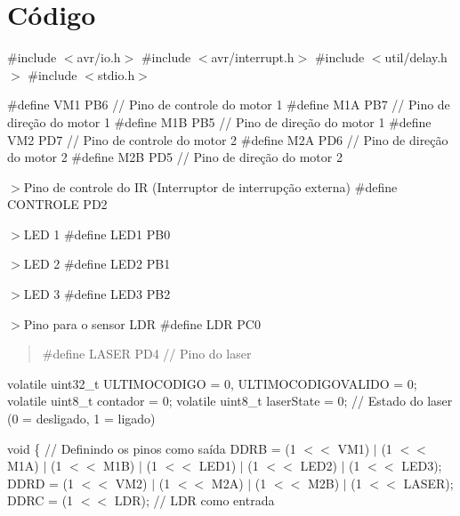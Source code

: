 \chapter{Código}
\hypertarget{md__src_2_c_x_c3_x_b3digo}{}\label{md__src_2_c_x_c3_x_b3digo}
\#include \texorpdfstring{$<$}{<}avr/io.\+h\texorpdfstring{$>$}{>} \#include \texorpdfstring{$<$}{<}avr/interrupt.\+h\texorpdfstring{$>$}{>} \#include \texorpdfstring{$<$}{<}util/delay.\+h\texorpdfstring{$>$}{>} \#include \texorpdfstring{$<$}{<}stdio.\+h\texorpdfstring{$>$}{>}

\#define VM1 PB6 // Pino de controle do motor 1 \#define M1A PB7 // Pino de direção do motor 1 \#define M1B PB5 // Pino de direção do motor 1 \#define VM2 PD7 // Pino de controle do motor 2 \#define M2A PD6 // Pino de direção do motor 2 \#define M2B PD5 // Pino de direção do motor 2

\texorpdfstring{$>$}{>}Pino de controle do IR (Interruptor de interrupção externa) \#define CONTROLE PD2

\texorpdfstring{$>$}{>}LED 1 \#define LED1 PB0

\texorpdfstring{$>$}{>}LED 2 \#define LED2 PB1

\texorpdfstring{$>$}{>}LED 3 \#define LED3 PB2

\texorpdfstring{$>$}{>}Pino para o sensor LDR \#define LDR PC0

\begin{quote}
 \#define LASER PD4 // Pino do laser \end{quote}
volatile uint32\+\_\+t ULTIMOCODIGO = 0, ULTIMOCODIGOVALIDO = 0; volatile uint8\+\_\+t contador = 0; volatile uint8\+\_\+t laser\+State = 0; // Estado do laser (0 = desligado, 1 = ligado)

void  \{ // Definindo os pinos como saída DDRB = (1 \texorpdfstring{$<$}{<}\texorpdfstring{$<$}{<} VM1) \texorpdfstring{$\vert$}{|} (1 \texorpdfstring{$<$}{<}\texorpdfstring{$<$}{<} M1A) \texorpdfstring{$\vert$}{|} (1 \texorpdfstring{$<$}{<}\texorpdfstring{$<$}{<} M1B) \texorpdfstring{$\vert$}{|} (1 \texorpdfstring{$<$}{<}\texorpdfstring{$<$}{<} LED1) \texorpdfstring{$\vert$}{|} (1 \texorpdfstring{$<$}{<}\texorpdfstring{$<$}{<} LED2) \texorpdfstring{$\vert$}{|} (1 \texorpdfstring{$<$}{<}\texorpdfstring{$<$}{<} LED3); DDRD = (1 \texorpdfstring{$<$}{<}\texorpdfstring{$<$}{<} VM2) \texorpdfstring{$\vert$}{|} (1 \texorpdfstring{$<$}{<}\texorpdfstring{$<$}{<} M2A) \texorpdfstring{$\vert$}{|} (1 \texorpdfstring{$<$}{<}\texorpdfstring{$<$}{<} M2B) \texorpdfstring{$\vert$}{|} (1 \texorpdfstring{$<$}{<}\texorpdfstring{$<$}{<} LASER); DDRC = (1 \texorpdfstring{$<$}{<}\texorpdfstring{$<$}{<} LDR); // LDR como entrada

